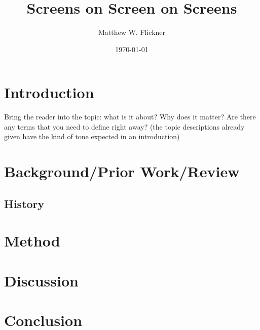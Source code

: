 \documentclass[a4paper]{article}
\title{Screens on Screen on Screens}
\author{Matthew W. Flickner}
\date{\today}
\begin{document}
\maketitle

\begin{abstract}
\end{abstract}

\section{Introduction}

Bring the reader into the topic: \cite{Truemper}
what is it about? Why does it matter? Are there 
any terms that you need to define \cite{Kang} right away? 
(the topic descriptions already given have the 
kind of tone expected in an introduction)\cite{Hutchings}

\section{Background/Prior Work/Review}
\label{sec:examples}

\subsection{History}

\section{Method}
\section{Discussion}
\section{Conclusion}



\end{document}
